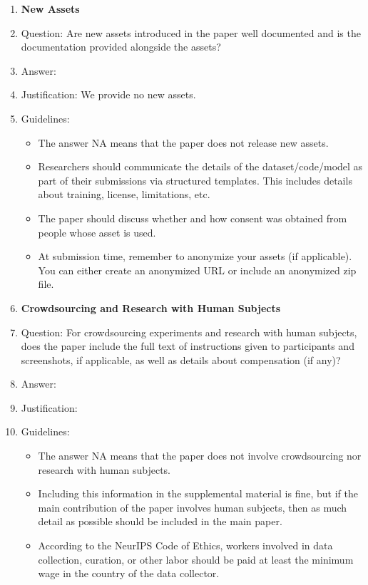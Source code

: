 \documentclass{article} %
\begin{document}
{\begin{appendices}
\begin{enumerate}
\item {\bf New Assets}
    \item[] Question: Are new assets introduced in the paper well documented and is the documentation provided alongside the assets?
    \item[] Answer: \answerNA{} %
    \item[] Justification: We provide no new assets.
    \item[] Guidelines:
    \begin{itemize}
        \item The answer NA means that the paper does not release new assets.
        \item Researchers should communicate the details of the dataset/code/model as part of their submissions via structured templates. This includes details about training, license, limitations, etc. 
        \item The paper should discuss whether and how consent was obtained from people whose asset is used.
        \item At submission time, remember to anonymize your assets (if applicable). You can either create an anonymized URL or include an anonymized zip file.
    \end{itemize}

    
\item {\bf Crowdsourcing and Research with Human Subjects}
    \item[] Question: For crowdsourcing experiments and research with human subjects, does the paper include the full text of instructions given to participants and screenshots, if applicable, as well as details about compensation (if any)? 
    \item[] Answer: \answerNA{} %
    \item[] Justification: \answerNA{}
    \item[] Guidelines:
    \begin{itemize}
        \item The answer NA means that the paper does not involve crowdsourcing nor research with human subjects.
        \item Including this information in the supplemental material is fine, but if the main contribution of the paper involves human subjects, then as much detail as possible should be included in the main paper. 
        \item According to the NeurIPS Code of Ethics, workers involved in data collection, curation, or other labor should be paid at least the minimum wage in the country of the data collector. 
    \end{itemize}


\end{enumerate}
\end{appendices}}
\end{document}
